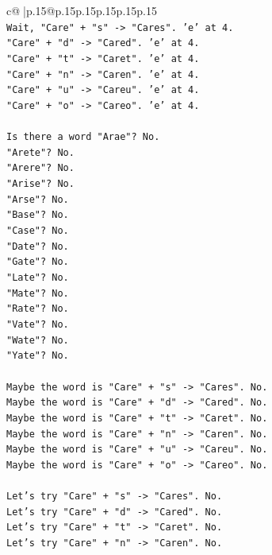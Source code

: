 \documentclass{article}
\begin{document}
{\begin{supertabular}{c@{$\;$}|p{.15\linewidth}@{}p{.15\linewidth}p{.15\linewidth}p{.15\linewidth}p{.15\linewidth}p{.15\linewidth}}
{{{\\ 
\texttt{Wait, "Care" + "s" {-}> "Cares". 'e' at 4.} \\
\texttt{"Care" + "d" {-}> "Cared". 'e' at 4.} \\
\texttt{"Care" + "t" {-}> "Caret". 'e' at 4.} \\
\texttt{"Care" + "n" {-}> "Caren". 'e' at 4.} \\
\texttt{"Care" + "u" {-}> "Careu". 'e' at 4.} \\
\texttt{"Care" + "o" {-}> "Careo". 'e' at 4.} \\
\\ 
\texttt{Is there a word "Arae"? No.} \\
\texttt{"Arete"? No.} \\
\texttt{"Arere"? No.} \\
\texttt{"Arise"? No.} \\
\texttt{"Arse"? No.} \\
\texttt{"Base"? No.} \\
\texttt{"Case"? No.} \\
\texttt{"Date"? No.} \\
\texttt{"Gate"? No.} \\
\texttt{"Late"? No.} \\
\texttt{"Mate"? No.} \\
\texttt{"Rate"? No.} \\
\texttt{"Vate"? No.} \\
\texttt{"Wate"? No.} \\
\texttt{"Yate"? No.} \\
\\ 
\texttt{Maybe the word is "Care" + "s" {-}> "Cares". No.} \\
\texttt{Maybe the word is "Care" + "d" {-}> "Cared". No.} \\
\texttt{Maybe the word is "Care" + "t" {-}> "Caret". No.} \\
\texttt{Maybe the word is "Care" + "n" {-}> "Caren". No.} \\
\texttt{Maybe the word is "Care" + "u" {-}> "Careu". No.} \\
\texttt{Maybe the word is "Care" + "o" {-}> "Careo". No.} \\
\\ 
\texttt{Let's try "Care" + "s" {-}> "Cares". No.} \\
\texttt{Let's try "Care" + "d" {-}> "Cared". No.} \\
\texttt{Let's try "Care" + "t" {-}> "Caret". No.} \\
\texttt{Let's try "Care" + "n" {-}> "Caren". No.} \\
}}}
\end{supertabular}}
\end{document}
